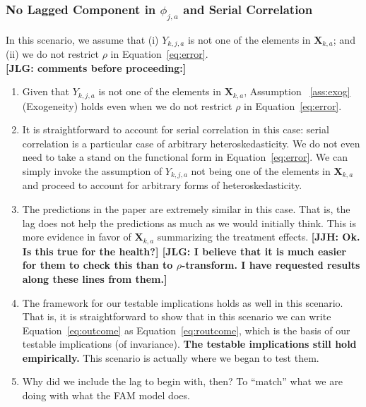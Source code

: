 \subsubsection{No Lagged Component in $\phi_{j,a}$ and Serial Correlation}

\noindent In this scenario, we assume that (i)  $Y_{k,j,a}$ is not one of the elements in $\bm{X}_{k,a}$; and (ii) we do not restrict $\rho$ in Equation~\eqref{eq:error}.\\

\noindent \textbf{[JLG: comments before proceeding:]}

\begin{enumerate}

\item Given that $Y_{k,j,a}$ is not one of the elements in $\bm{X}_{k,a}$, Assumption ~\ref{ass:exog} (Exogeneity) holds even when we do not restrict $\rho$ in Equation~\eqref{eq:error}. 

\item It is straightforward to account for serial correlation in this case: serial correlation is a particular case of arbitrary heteroskedasticity. We do not even need to take a stand on the functional form in Equation~\eqref{eq:error}. We can simply invoke the assumption of $Y_{k,j,a}$ not being one of the elements in $\bm{X}_{k,a}$ and proceed to account for arbitrary forms of heteroskedasticity. 

\item The predictions in the paper are extremely similar in this case. That is, the lag does not help the predictions as much as we would initially think. This is more evidence in favor of $\bm{X}_{k,a}$ summarizing the treatment effects. \textbf{[JJH: Ok. Is this true for the health?] [JLG: I believe that it is much easier for them to check this than to $\rho$-transform. I have requested results along these lines from them.]}

\item The framework for our testable implications holds as well in this scenario. That is, it is straightforward to show that in this scenario we can write Equation~\eqref{eq:outcome} as Equation~\eqref{eq:routcome}, which is the basis of our testable implications (of invariance). \textbf{The testable implications still hold empirically.} This scenario is actually where we began to test them.

\item Why did we include the lag to begin with, then? To ``match'' what we are doing with what the FAM model does. 

\end{enumerate}

